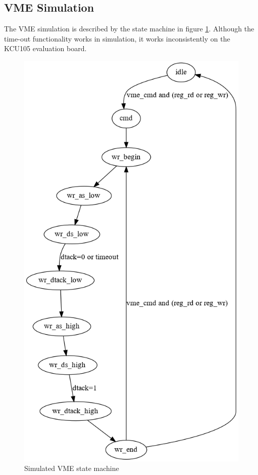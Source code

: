 \documentclass[10pt,a4paper]{article}
\begin{document}
\subsection{VME Simulation}

The VME simulation is described by the state machine in figure \ref{fig:vmestatemachine}. Although the time-out functionality works in simulation, it works inconsistently on the KCU105 evaluation board. 

\begin{figure}[H]
\includegraphics[width= 0.4 \textwidth]{figures/vmestates.png}
\caption{Simulated VME state machine}
\label{fig:vmestatemachine}
\end{figure}

%
%
\end{document}
